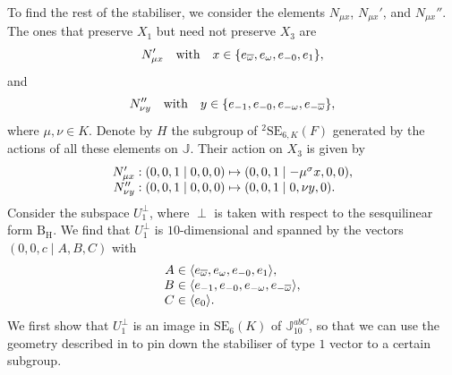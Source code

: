 \documentclass{amsart}
\newcommand{\SE}{\mathrm{SE}}
\newcommand{\J}{\mathbb{J}}
\renewcommand{\bar}{\overline}
\newcommand{\B}{\mathrm{B}}
\renewcommand{\H}{\mathrm{H}}
\newcommand{\s}{\sigma}
\theoremstyle{plain}
\numberwithin{theorem}{section}
\theoremstyle{definition}
\begin{document}
To find the rest of the stabiliser, we consider the elements $N_{\mu x}$,
$N_{\mu x}'$, and $N_{\mu x}''$.  The ones that preserve $X_1$ but
need not preserve $X_3$ are
\begin{equation*}
	N_{\mu x}'\quad\hbox{with}\quad
	x\in\{e_{\bar{\omega}},e_\omega,e_{-0},e_1\},
\end{equation*}
and
\begin{equation*}
	N_{\nu y}''\quad\hbox{with}\quad
	y\in\{e_{-1},e_{-0},e_{-\omega},e_{-\bar{\omega}}\},
\end{equation*}
where $\mu,\nu\in K$.  Denote by $H$ the subgroup of
${}^2\SE_{6,K}(F)$ generated by the actions of all these elements on
$\J$.  Their action on $X_3$ is given by
\begin{equation}
	\begin{array}{r@{\;}c@{\;}l}
		N_{\mu x}': (0,0,1\mid 0,0,0) & \mapsto & (0,0,1\mid -\mu^{\s} x, 0, 0), \\
		N_{\nu y}'': (0,0,1\mid 0,0,0) & \mapsto & (0,0,1\mid 0, \nu y, 0).  
	\end{array}
\end{equation}
Consider the subspace $U_1^{\perp}$, where $\perp$ is taken with respect to
the sesquilinear form $\B_{\H}$. We find that $U_1^{\perp}$ is $10$-dimensional and
spanned by the vectors $(0,0,c\mid A,B,C)$ with
\begin{equation}
	\begin{array}{r@{\;}c@{\;}l}
		A & \in & \langle e_{\bar{\omega}}, e_{\omega}, e_{-0}, e_1 \rangle, \\
		B & \in & \langle e_{-1}, e_{-0}, e_{-\omega}, e_{-\bar{\omega}} \rangle, \\
		C & \in & \langle e_0 \rangle.
	\end{array}
\end{equation}
We first show that $U_1^{\perp}$ is an image in $\SE_6(K)$
of $\J_{10}^{abC}$, so that we can use the geometry 
described in \cite[Section 1]{BSW1} to pin down
the stabiliser of type $1$ vector to a certain subgroup.
\end{document}
